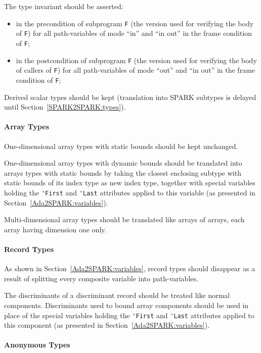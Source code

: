 \documentclass{article}
\begin{document}
The type invariant should be asserted:
\begin{itemize}
\item in the precondition of subprogram \verb|F| (the version used for
  verifying the body of \verb|F|) for all path-variables of mode ``in'' and
  ``in out'' in the frame condition of \verb|F|;
\item in the postcondition of subprogram \verb|F| (the version used for
  verifying the body of callers of \verb|F|) for all path-variables of mode
  ``out'' and ``in out'' in the frame condition of \verb|F|;
\end{itemize}

Derived scalar types should be kept (translation into SPARK subtypes is delayed
until Section~\ref{SPARK2SPARK:types}).

\paragraph{Array Types}

One-dimensional array types with static bounds should be kept unchanged.

One-dimensional array types with dynamic bounds should be translated into
arrays types with static bounds by taking the closest enclosing subtype with
static bounds of its index type as new index type, together with special
variables holding the \verb|'First| and \verb|'Last| attributes applied to this
variable (as presented in Section~\ref{Ada2SPARK:variables}).

Multi-dimensional array types should be translated like arrays of arrays, each
array having dimension one only.

\paragraph{Record Types}

As shown in Section~\ref{Ada2SPARK:variables}, record types should disappear
as a result of splitting every composite variable into path-variables.

The discriminants of a discriminant record should be treated like normal
components. Discriminants used to bound array components should be used in
place of the special variables holding the \verb|'First| and \verb|'Last|
attributes applied to this component (as presented in
Section~\ref{Ada2SPARK:variables}). 

\paragraph{Anonymous Types}
\end{document}
